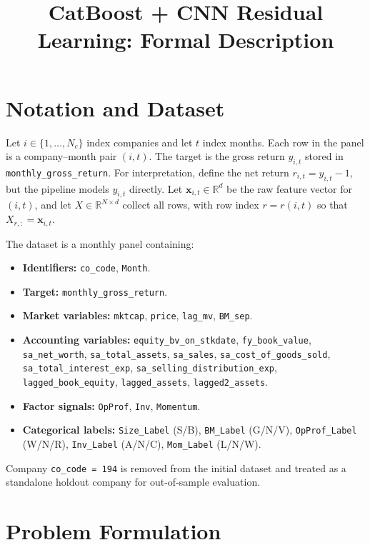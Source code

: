 \documentclass[11pt]{article}
\title{CatBoost + CNN Residual Learning: Formal Description}
\date{}
\begin{document}
\maketitle

\section{Notation and Dataset}

Let $i \in \{1,\dots,N_c\}$ index companies and let $t$ index months. Each row in the
panel is a company--month pair $(i,t)$. The target is the gross return
$y_{i,t}$ stored in \texttt{monthly\_gross\_return}. For interpretation, define the
net return $r_{i,t} = y_{i,t} - 1$, but the pipeline models $y_{i,t}$ directly.
Let $\mathbf{x}_{i,t} \in \mathbb{R}^d$ be the raw feature vector for $(i,t)$, and
let $X \in \mathbb{R}^{N \times d}$ collect all rows, with row index
$r = r(i,t)$ so that $X_{r,:} = \mathbf{x}_{i,t}$.

The dataset is a monthly panel containing:
\begin{itemize}
	\item \textbf{Identifiers:} \texttt{co\_code}, \texttt{Month}.
	\item \textbf{Target:} \texttt{monthly\_gross\_return}.
	\item \textbf{Market variables:} \texttt{mktcap}, \texttt{price},
	\texttt{lag\_mv}, \texttt{BM\_sep}.
	\item \textbf{Accounting variables:} \texttt{equity\_bv\_on\_stkdate},
	\texttt{fy\_book\_value}, \texttt{sa\_net\_worth}, \texttt{sa\_total\_assets},
	\texttt{sa\_sales}, \texttt{sa\_cost\_of\_goods\_sold},
	\texttt{sa\_total\_interest\_exp}, \texttt{sa\_selling\_distribution\_exp},
	\texttt{lagged\_book\_equity}, \texttt{lagged\_assets}, \texttt{lagged2\_assets}.
	\item \textbf{Factor signals:} \texttt{OpProf}, \texttt{Inv}, \texttt{Momentum}.
	\item \textbf{Categorical labels:} \texttt{Size\_Label} (S/B),
	\texttt{BM\_Label} (G/N/V), \texttt{OpProf\_Label} (W/N/R),
	\texttt{Inv\_Label} (A/N/C), \texttt{Mom\_Label} (L/N/W).
\end{itemize}

Company \texttt{co\_code = 194} is removed from the initial dataset and treated as
a standalone holdout company for out-of-sample evaluation.

\section{Problem Formulation}
\end{document}
